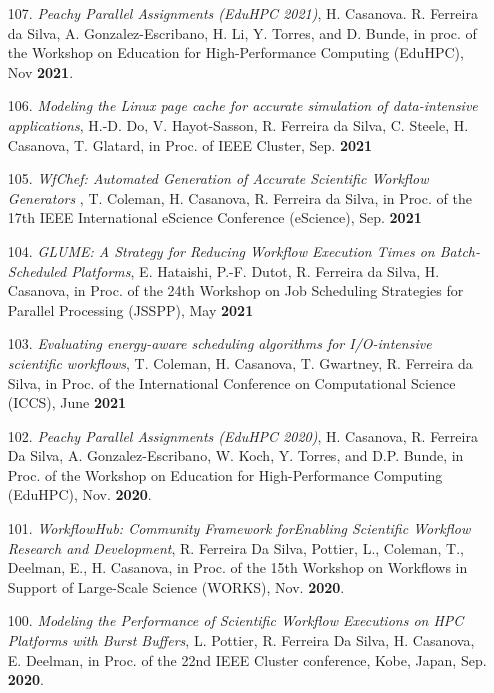 \begin{enumerate}
\item [107.] {\it Peachy Parallel Assignments (EduHPC 2021)}, H.  Casanova.
R. Ferreira da Silva, A. Gonzalez-Escribano, H. Li, Y. Torres, and D.
Bunde, in proc. of the Workshop on Education for High-Performance Computing
(EduHPC), Nov {\bf 2021}.


    \item [106.] {\it Modeling the Linux page cache for accurate simulation of data-intensive applications}, H.-D. Do, V. Hayot-Sasson, R. Ferreira da Silva, C. Steele, H. Casanova, T. Glatard, in Proc. of IEEE Cluster, Sep. {\bf 2021}

    \item [105.] {\it WfChef: Automated Generation of Accurate Scientific Workflow Generators
}, T. Coleman, H. Casanova, R. Ferreira da Silva, in Proc. of the 17th IEEE International eScience Conference (eScience), Sep. {\bf 2021}

    \item [104.] {\it GLUME: A Strategy for Reducing Workflow Execution Times on Batch-Scheduled Platforms}, E. Hataishi, P.-F. Dutot, R. Ferreira da Silva, H. Casanova, in Proc. of the 24th Workshop on Job Scheduling Strategies for Parallel Processing (JSSPP), May {\bf 2021}

    \item [103.] {\it Evaluating energy-aware scheduling algorithms for
    I/O-intensive scientific workflows}, T. Coleman, H. Casanova, T.
    Gwartney, R. Ferreira da Silva,
	in Proc. of the International Conference on Computational Science
	(ICCS), June {\bf 2021}


    \item [102.] {\it Peachy Parallel Assignments (EduHPC 2020)},
H. Casanova, R. Ferreira Da Silva, A. Gonzalez-Escribano, W. Koch, Y.
Torres, and D.P. Bunde, in Proc. of the Workshop on Education for
High-Performance Computing (EduHPC), Nov. {\bf 2020}.

\item [101.] {\it WorkflowHub: Community Framework forEnabling
Scientific Workflow Research and Development},
R. Ferreira Da Silva, Pottier, L., Coleman, T., Deelman, E., H. Casanova,
in Proc. of the 15th Workshop on Workflows in Support of
Large-Scale Science (WORKS), Nov. {\bf 2020}.

\item [100.] {\it Modeling the Performance of Scientific Workflow Executions on HPC Platforms with Burst Buffers},
L. Pottier, R. Ferreira Da Silva, H. Casanova, E. Deelman,
in Proc. of the 22nd IEEE Cluster conference, Kobe, Japan, Sep. {\bf 2020}.


\end{enumerate}
